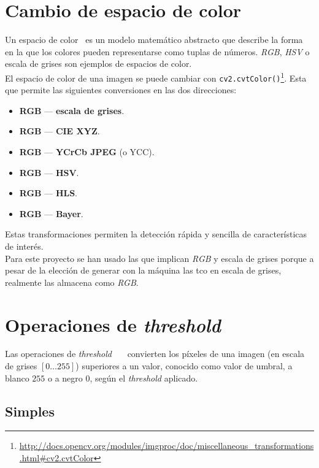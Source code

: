 \section{Cambio de espacio de color}\label{tecnica:cambio-color}
Un espacio de color~\emph{\citep*[Changing
  Colorspaces]{opencv_tutorial-bib}} es un modelo matemático abstracto
que describe la forma en la que los colores pueden representarse como
tuplas de
números. \emph{RGB}, \emph{HSV} o escala de grises son ejemplos de espacios de color. \\
El espacio de color de una imagen se puede cambiar con
\texttt{cv2.cvtColor()}\footnote{\url{http://docs.opencv.org/modules/imgproc/doc/miscellaneous\_transformations.html\#cv2.cvtColor}}. Esta
que permite las siguientes conversiones en las dos direcciones:
\begin{itemize}
\item \textbf{RGB} --- \textbf{escala de grises}.
\item \textbf{RGB} --- \textbf{CIE XYZ}.
\item \textbf{RGB} --- \textbf{YCrCb JPEG} (o YCC).
\item \textbf{RGB} --- \textbf{HSV}.
\item \textbf{RGB} --- \textbf{HLS}.
\item \textbf{RGB} --- \textbf{Bayer}.
\end{itemize}
Estas transformaciones permiten la detección rápida y sencilla de
características de interés. \\
Para este proyecto se han usado las que implican \emph{RGB} y escala
de grises porque a pesar de la elección de generar con la máquina las
\gls{tco} en escala de grises, realmente las almacena como \emph{RGB}.

\section{Operaciones de \emph{threshold}}
Las operaciones de \emph{threshold}~\emph{\citep*[Image
  Thresholding]{opencv_tutorial-bib}}~\emph{\citep*[Threshold]{opencv_book-bib}}~\emph{\citep*[6.5
  Thresholding]{toennies2012guide}} convierten los píxeles de una
imagen (en escala de grises $\left[0 \dots 255\right]$) superiores a
un valor, conocido como valor de umbral, a blanco $255$ o a negro $0$,
según el \emph{threshold} aplicado.
\subsection{Simples}
